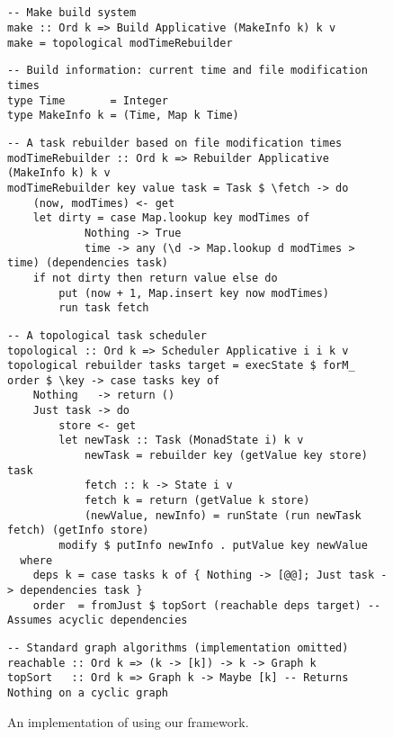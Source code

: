 \subsection{\Make}\label{sec-implementation-make}

\begin{figure}
\begin{verbatim}
-- Make build system
make :: Ord k => Build Applicative (MakeInfo k) k v
make = topological modTimeRebuilder
\end{verbatim}
\vspace{0mm}
\begin{verbatim}
-- Build information: current time and file modification times
type Time       = Integer
type MakeInfo k = (Time, Map k Time)
\end{verbatim}
\vspace{0mm}
\begin{verbatim}
-- A task rebuilder based on file modification times
modTimeRebuilder :: Ord k => Rebuilder Applicative (MakeInfo k) k v
modTimeRebuilder key value task = Task $ \fetch -> do
    (now, modTimes) <- get
    let dirty = case Map.lookup key modTimes of
            Nothing -> True
            time -> any (\d -> Map.lookup d modTimes > time) (dependencies task)
    if not dirty then return value else do
        put (now + 1, Map.insert key now modTimes)
        run task fetch
\end{verbatim}
\vspace{0mm}
\begin{verbatim}
-- A topological task scheduler
topological :: Ord k => Scheduler Applicative i i k v
topological rebuilder tasks target = execState $ forM_ order $ \key -> case tasks key of
    Nothing   -> return ()
    Just task -> do
        store <- get
        let newTask :: Task (MonadState i) k v
            newTask = rebuilder key (getValue key store) task
            fetch :: k -> State i v
            fetch k = return (getValue k store)
            (newValue, newInfo) = runState (run newTask fetch) (getInfo store)
        modify $ putInfo newInfo . putValue key newValue
  where
    deps k = case tasks k of { Nothing -> [@@]; Just task -> dependencies task }
    order  = fromJust $ topSort (reachable deps target) -- Assumes acyclic dependencies
\end{verbatim}
\vspace{0mm}
\begin{verbatim}
-- Standard graph algorithms (implementation omitted)
reachable :: Ord k => (k -> [k]) -> k -> Graph k
topSort   :: Ord k => Graph k -> Maybe [k] -- Returns Nothing on a cyclic graph
\end{verbatim}
\vspace{-3mm}
\caption{An implementation of \Make using our framework.}\label{fig-make-implementation}
\vspace{-3mm}
\end{figure}

